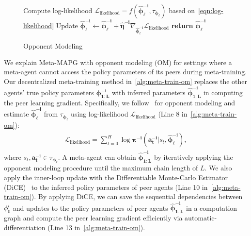 \begin{figure}[H]
\begin{minipage}[t]{0.49\textwidth}
\begin{algorithm}[H]
	\caption{Opponent Modeling}\label{alg:opponent-modeling}  
	\small
	\begin{algorithmic}[1]
	    	    \STATE Compute log-likelihood $\mathcal{L}_{\text{likelihood}}=f(\bm{\hat{\phi}}^{\bm{-i}}_{\bm{\ell}},\tau_{\bm{\phi}_{\bm{\ell}}})$ based on~\cref{eqn:log-likelihood}
	    	    \STATE Update $\bm{\hat{\phi}}^{\bm{-i}}_{\bm{\ell}}\leftarrow\bm{\hat{\phi}}^{\bm{-i}}_{\bm{\ell}}+\bm{\hat{\eta}}^{\bm{-i}}\nabla_{\bm{\hat{\phi}}^{\bm{-i}}_{\bm{\ell}}}\mathcal{L}_{\text{likelihood}}$
	    	\ENDWHILE
	    	\STATE \textbf{return} $\bm{\hat{\phi}}^{\bm{-i}}_{\bm{\ell}}$
       \ENDFUNCTION
	\end{algorithmic}
\end{algorithm}
\end{minipage}
\end{figure}
\vspace{-0.5cm}
We explain Meta-MAPG with opponent modeling (OM) for settings where a meta-agent cannot access the policy parameters of its peers during meta-training.
Our decentralized meta-training method in~\cref{alg:meta-train-om} replaces the other agents' true policy parameters $\bm{\phi}^{\bm{-i}}_{\bm{1:L}}$ with inferred parameters $\bm{\hat{\phi}}^{\bm{-i}}_{\bm{1:L}}$ in computing the peer learning gradient.
Specifically, we follow~\citet{foerster17lola} for opponent modeling and estimate $\bm{\hat{\phi}}^{\bm{-i}}_{\bm{\ell}}$ from $\tau_{\bm{\phi}_{\bm{\ell}}}$ using log-likelihood $\mathcal{L}_{\text{likelihood}}$ (Line 8 in~\cref{alg:meta-train-om}): 
\begin{align}\label{eqn:log-likelihood}
\begin{split}
\mathcal{L}_{\text{likelihood}}=\sum_{t=0}^{H}\log\bm{\pi}^{\bm{-i}}(\bm{a}^{\bm{-i}}_{\bm{t}}|s_{t},\bm{\hat{\phi}}^{\bm{-i}}_{\bm{\ell}}),
\end{split}
\end{align}
where $s_{t},\bm{a}_{\bm{t}}^{\bm{-i}}\in\tau_{\bm{\phi}_{\bm{\ell}}}$.
A meta-agent can obtain $\bm{\hat{\phi}}^{\bm{-i}}_{\bm{1:L}}$ by iteratively applying the opponent modeling procedure until the maximum chain length of $L$.
We also apply the inner-loop update with the Differentiable Monte-Carlo Estimator (DiCE)~\citep{foerster2018dice} to the inferred policy parameters of peer agents (Line 10 in~\cref{alg:meta-train-om}). 
By applying DiCE, we can save the sequential dependencies between $\phi^{i}_{0}$ and updates to the policy parameters of peer agents $\bm{\hat{\phi}}^{\bm{-i}}_{\bm{1:L}}$ in a computation graph and compute the peer learning gradient efficiently via automatic-differentiation (Line 13 in~\cref{alg:meta-train-om}).

